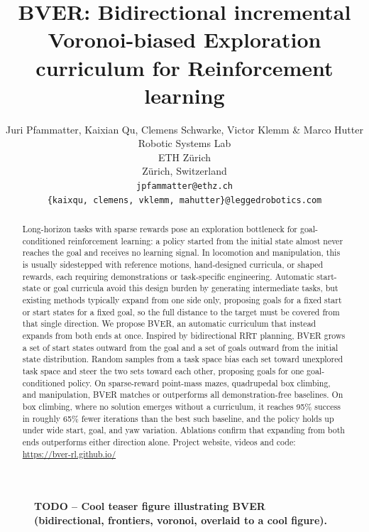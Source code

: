 \documentclass{article} %
\title{BVER: Bidirectional incremental Voronoi-biased Exploration curriculum for Reinforcement learning}
\author{Juri Pfammatter, Kaixian Qu, Clemens Schwarke, Victor Klemm \& Marco Hutter \\
Robotic Systems Lab\\
ETH Z\"urich\\
Z\"urich, Switzerland \\
\texttt{jpfammatter@ethz.ch}\\
\texttt{\{kaixqu, clemens, vklemm, mahutter\}@leggedrobotics.com} \\
}
\begin{document}
\maketitle

\begin{figure}[H]
    \centering
    \caption{\textbf{TODO -- Cool teaser figure illustrating BVER
            (bidirectional, frontiers, voronoi, overlaid to a cool figure).}}
    \label{fig:teaser}
\end{figure}

\begin{abstract}
    Long-horizon tasks with sparse rewards pose an exploration bottleneck for goal-conditioned reinforcement learning: a policy started from the initial state almost never reaches the goal and receives no learning signal. In locomotion and manipulation, this is usually sidestepped with reference motions, hand-designed curricula, or shaped rewards, each requiring demonstrations or task-specific engineering. Automatic start-state or goal curricula avoid this design burden by generating intermediate tasks, but existing methods typically expand from one side only, proposing goals for a fixed start or start states for a fixed goal, so the full distance to the target must be covered from that single direction.
    We propose BVER, an automatic curriculum that instead expands from both ends at once. Inspired by bidirectional RRT planning, BVER grows a set of start states outward from the goal and a set of goals outward from the initial state distribution. Random samples from a task space bias each set toward unexplored task space and steer the two sets toward each other, proposing goals for one goal-conditioned policy.
    On sparse-reward point-mass mazes, quadrupedal box climbing, and manipulation, BVER matches or outperforms all demonstration-free baselines. On box climbing, where no solution emerges without a curriculum, it reaches 95\% success in roughly 65\% fewer iterations than the best such baseline, and the policy holds up under wide start, goal, and yaw variation. Ablations confirm that expanding from both ends outperforms either direction alone.
    Project website, videos and code: \url{https://bver-rl.github.io/}
\end{abstract}
\end{document}
